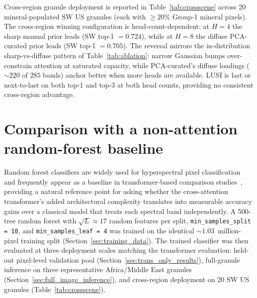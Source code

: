 \documentclass[preprint,12pt]{elsarticle}
\begin{document}
Cross-region granule deployment is reported in Table~\ref{tab:crossscene} across 20 mineral-populated SW US granules (each with $\geq 20\%$ Group-1 mineral pixels). The cross-region winning configuration is head-count-dependent: at $H = 4$ the sharp manual prior leads (SW top-1 $= 0.724$), while at $H = 8$ the diffuse PCA-curated prior leads (SW top-1 $= 0.705$). The reversal mirrors the in-distribution sharp-vs-diffuse pattern of Table~\ref{tab:ablation}: narrow Gaussian bumps over-constrain attention at saturated capacity, while PCA-curated's diffuse loadings ($\sim$$220$ of $285$ bands) anchor better when more heads are available. LUSI is last or next-to-last on both top-1 and top-3 at both head counts, providing no consistent cross-region advantage.

\section{Comparison with a non-attention random-forest baseline}
\label{sec:rf_baseline_comparison}

Random forest classifiers are widely used for hyperspectral pixel classification~\cite{wang2022hyspex} and frequently appear as a baseline in transformer-based comparison studies~\cite{hong2021spectralformer}, providing a natural reference point for asking whether the cross-attention transformer's added architectural complexity translates into measurable accuracy gains over a classical model that treats each spectral band independently. A 500-tree random forest with $\sqrt{L} \approx 17$ random features per split, \texttt{min\_samples\_split = 10}, and \texttt{min\_samples\_leaf = 4} was trained on the identical $\sim$$1.03$~million-pixel training split (Section~\ref{sec:training_data}). The trained classifier was then evaluated at three deployment scales matching the transformer evaluation: held-out pixel-level validation pool (Section~\ref{sec:trans_only_results}), full-granule inference on three representative Africa/Middle East granules (Section~\ref{sec:full_image_inference}), and cross-region deployment on 20 SW US granules (Table~\ref{tab:crossscene}).
\end{document}
